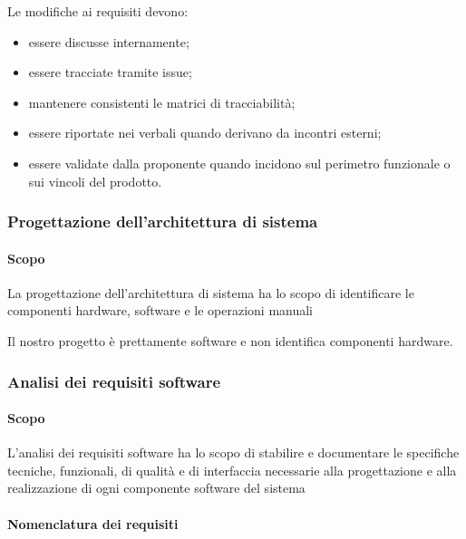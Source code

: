 Le modifiche ai requisiti devono:

\begin{itemize}
    \item essere discusse internamente;
    \item essere tracciate tramite issue;
    \item mantenere consistenti le matrici di tracciabilità;
    \item essere riportate nei verbali quando derivano da incontri esterni;
    \item essere validate dalla proponente quando incidono sul perimetro funzionale
    o sui vincoli del prodotto.
\end{itemize}


\subsubsection{Progettazione dell'architettura di sistema}

\paragraph{Scopo}

La progettazione dell'architettura di sistema ha lo scopo di identificare le componenti hardware, software e le operazioni manuali

Il nostro progetto è prettamente software e non identifica componenti hardware.


\subsubsection{Analisi dei requisiti software}

\paragraph{Scopo}

L'analisi dei requisiti software ha lo scopo di stabilire e documentare le specifiche tecniche, funzionali, di qualità e di interfaccia necessarie alla progettazione e alla realizzazione di ogni componente software del sistema



\paragraph{Nomenclatura dei requisiti}

